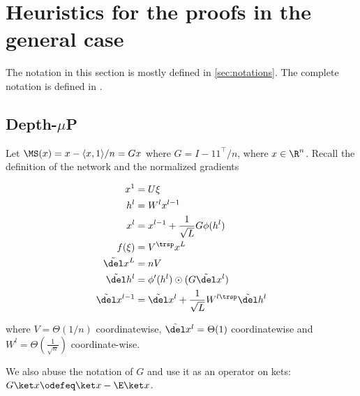 \section{Heuristics for the proofs in the general case}

The notation in this section is mostly defined in \cref{sec:notations}. The complete notation is defined in \cite{yang2023tensor}.
\subsection{Depth-$\mu$P}\label{heuristics:depth-mup}

Let $\MS(x)=x-\langle x,1\rangle/n=Gx$ where $G=I-11^{\top}/n$,
where $x\in\R^{n}$. Recall the definition of the network and the normalized gradients

\begin{align*}
x^{1} & =U\xi\\
h^{l} & =W^{l}x^{l-1}\\
x^{l} & =x^{l-1}+\frac{1}{\sqrt{L}}G\phi(h^{l})\\
f(\xi) & =V^{\trsp}x^{L}\\
\tilde\del x^{L} & =nV\\
\tilde\del h^{l} & =\phi'(h^{l})\odot(G\tilde\del x^{l})\\
\tilde\del x^{l-1} & =\tilde\del x^{l}+\frac{1}{\sqrt{L}}W^{l\trsp}\tilde\del h^{l}
\end{align*}

where $V=\Theta(1/n)$ coordinatewise, $\tilde\del x^{l}=\Theta(1)$ coordinatewise
and $W^{l}=\Theta(\frac{1}{\sqrt{n}})$ coordinate-wise. 

We also abuse the notation of $G$ and use it as an operator on kets: $G\ket x\odefeq \ket x - \E\ket x$. 

